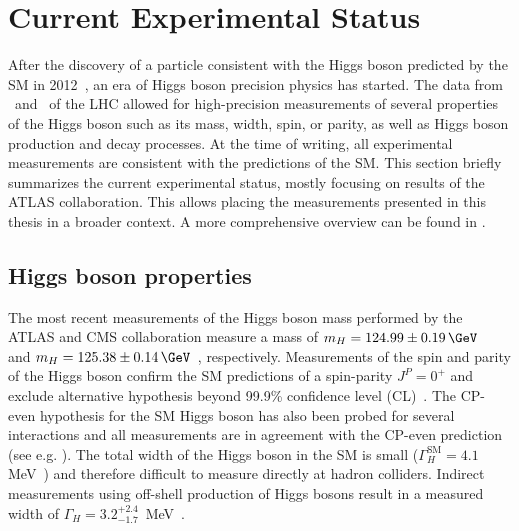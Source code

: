 \section{Current Experimental Status}
\label{subsec:higgs-exp-status}
After the discovery of a particle consistent with the Higgs boson predicted by the SM in 2012~\cite{HIGG-2012-27,CMS-HIG-12-028}, an era of Higgs boson precision physics has started.
The data from \RunOne\ and \RunTwo\ of the LHC allowed for high-precision measurements of several properties of the Higgs boson such as its mass, width, spin, or parity, as well as Higgs boson production and decay processes. 
At the time of writing, all experimental measurements are consistent with the predictions of the SM.
This section briefly summarizes the current experimental status, mostly focusing on results of the ATLAS collaboration. This allows placing the measurements presented in this thesis in a broader context. 
A more comprehensive overview can be found in . 

\subsection{Higgs boson properties}
The most recent measurements of the Higgs boson mass performed by the ATLAS and CMS collaboration measure a mass of $m_H = 124.99 \pm 0.19\,\GeV$~\cite{https://doi.org/10.48550/arxiv.2207.00320} and $m_H = 125.38 \pm 0.14\,\GeV$~\cite{Sirunyan_2020mass}, respectively.
Measurements of the spin and parity of the Higgs boson confirm the SM predictions of a spin-parity $J^{P} = 0^{+}$ and exclude alternative hypothesis beyond 99.9\% confidence level (CL)~\cite{HIGG-2013-17-witherratum,CMS-HIG-14-018}.
The CP-even hypothesis for the SM Higgs boson has also been probed for several interactions and all measurements are in agreement with the CP-even prediction (see e.g. ).
The total width of the Higgs boson in the SM is small ($\Gamma_H^{\text{SM}} = 4.1\,$ MeV~\cite{deFlorian:2016spz}) and therefore difficult to measure directly at hadron colliders. Indirect measurements using off-shell production of Higgs bosons result in a measured width of $\Gamma_H = 3.2 ^{+2.4}_{-1.7}\,$ MeV~\cite{https://doi.org/10.48550/arxiv.2202.06923}.

